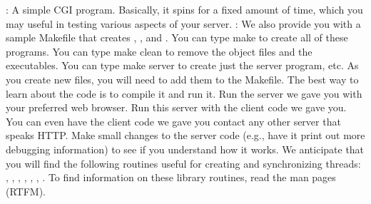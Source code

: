 \markdownRendererUlItem {}: A simple CGI program. Basically, it spins for a fixed amount of time, which you may useful in testing various aspects of your server. \markdownRendererUlItemEnd 
\markdownRendererUlItem {}: We also provide you with a sample Makefile that creates , , and . You can type make to create all of these programs. You can type make clean to remove the object files and the executables. You can type make server to create just the server program, etc. As you create new files, you will need to add them to the Makefile.\markdownRendererUlItemEnd 
\markdownRendererUlEndTight \markdownRendererInterblockSeparator
{}The best way to learn about the code is to compile it and run it. Run the server we gave you with your preferred web browser. Run this server with the client code we gave you. You can even have the client code we gave you contact any other server that speaks HTTP. Make small changes to the server code (e.g., have it print out more debugging information) to see if you understand how it works.\markdownRendererInterblockSeparator
{}\markdownRendererInterblockSeparator
{}We anticipate that you will find the following routines useful for creating and synchronizing threads: , , , , , , . To find information on these library routines, read the man pages (RTFM). \markdownRendererInterblockSeparator
